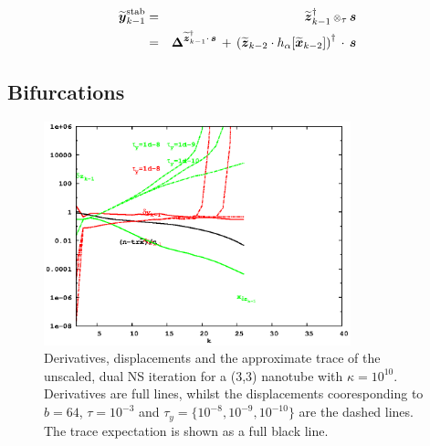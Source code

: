 \documentclass[letterpaper,twocolumn,amsmath,amsfont,amssymb,english,aps,jcp,preprintnumbers,groupaddress,nofootinbib,tightenlines,floatfix]{revtex4}
\newcommand{\mat}[1]{\boldsymbol{#1}}
\newcommand{\ot}{  {\scriptstyle \otimes}_{ \tau } }
\theoremstyle{plain}
\theoremstyle{remark}
\theoremstyle{plain}
\begin{document}
\begin{eqnarray}
\widetilde{\mat{y}}^{\rm stab}_{k-1} &=& \widetilde{\mat{z}}^{\dagger}_{k-1} \, \ot \, \mat{s} \\
                                  &=& \mat{\Delta}^{\widetilde{\mat{z}}^\dagger_{k-1} \cdot \, \mat{s}} \, + \,
\left( \widetilde{\mat{z}}_{k-2} \cdot h_\alpha[ \widetilde{\mat{x}}_{k-2}] \right)^\dagger \, \cdot \, \mat{s}
\end{eqnarray}

\subsection{Bifurcations}

\begin{figure}[h] \label{flow_noscale_dual}
\includegraphics[width=3.5in]{fig_33_tube_cond_10_noscaling/33_nanotube_cond10_noscale_dual.eps}
\caption{Derivatives, displacements and the approximate trace of the unscaled, dual NS iteration for a (3,3) nanotube with $\kappa =10^{10}$.
Derivatives are full lines, whilst the displacements cooresponding to $b=64$, $\tau=10^{-3}$ and $\tau_y=\{10^{-8}, 10^{-9}, 10^{-10}\}$
are the dashed lines.  The trace expectation is shown as a full black line. }
\end{figure}


\end{document}
